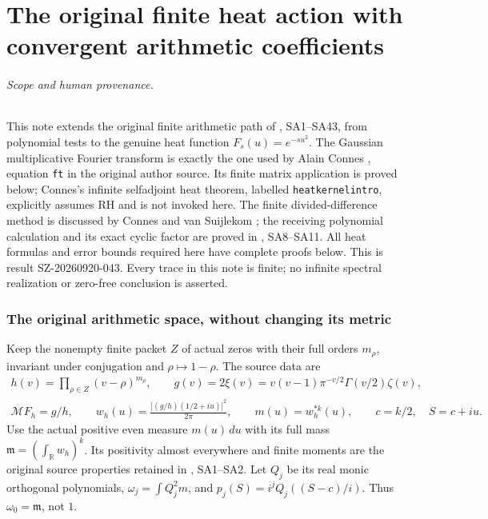 

\clearpage\begingroup
\part*{The original finite heat action with convergent arithmetic coefficients}
\newcommand{\nhpC}{\mathbb C}\newcommand{\nhpR}{\mathbb R}
\newcommand{\nhptr}{\operatorname{tr}}\newcommand{\nhpdd}{\dagger_G}
\newcommand{\nhpeps}{\epsilon}\newcommand{\nhpspec}{\operatorname{spec}}
\newtheorem{nhptheorem}{Theorem}[section]
\newtheorem{nhplemma}[nhptheorem]{Lemma}


\paragraph{Scope and human provenance.}
This note extends the original finite arithmetic path of
\cite{nhp:NativeAction}, SA1--SA43, from polynomial tests to the
genuine heat function \(F_s(u)=e^{-su^2}\).
The Gaussian multiplicative Fourier transform is exactly the
one used by Alain Connes \cite{nhp:ConnesHeat}, equation
\texttt{ft} in the original author source. Its finite matrix
application is proved below; Connes's infinite selfadjoint
heat theorem, labelled \texttt{heatkernelintro}, explicitly
assumes RH and is not invoked here.
The finite divided-difference method is discussed by Connes
and van Suijlekom \cite{nhp:CV}; the receiving polynomial
calculation and its exact cyclic factor are proved in
\cite{nhp:NativeAction}, SA8--SA11. All heat formulas and error
bounds required here have complete proofs below.
This is result SZ-20260920-043. Every trace in this note is
finite; no infinite spectral realization or zero-free
conclusion is asserted.

\section{The original arithmetic space, without changing its metric}

Keep the nonempty finite packet \(Z\) of actual zeros with
their full orders \(m_\rho\), invariant under conjugation
and \(\rho\mapsto1-\rho\). The source data are
\begin{equation}\tag{NH1}\label{nhp:NH1}
\begin{gathered}
h(v)=\prod_{\rho\in Z}(v-\rho)^{m_\rho},\qquad
g(v)=2\xi(v)=v(v-1)\pi^{-v/2}\Gamma(v/2)\zeta(v),\\
\mathcal M F_h=g/h,\qquad
w_h(u)=\frac{|(g/h)(1/2+iu)|^2}{2\pi},\qquad
m(u)=w_h^{*k}(u),\qquad c=k/2,\quad S=c+iu .
\end{gathered}
\end{equation}
Use the actual positive even measure \(m(u)\,du\) with
its full mass
\(\mathfrak m=(\int_\nhpR w_h)^k\). Its positivity almost
everywhere and finite moments are the original source
properties retained in \cite{nhp:NativeAction}, SA1--SA2.
Let \(Q_j\) be its real monic orthogonal polynomials,
\(\omega_j=\int Q_j^2m\), and
\(p_j(S)=i^jQ_j((S-c)/i)\). Thus
\(\omega_0=\mathfrak m\), not \(1\).

